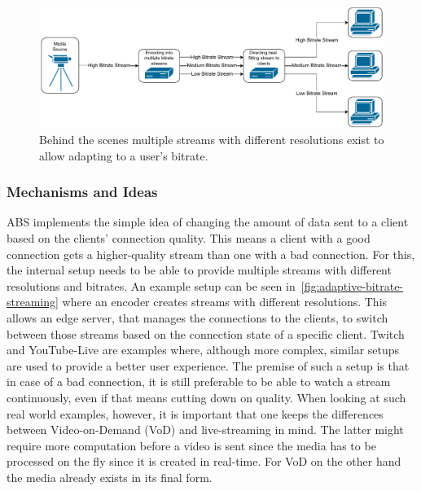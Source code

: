 \vspace{0.5cm}
\begin{figure}[H]
    \centering
    \includegraphics[width=\textwidth]{figures/02_background/adaptive-bitrate-streaming.drawio.pdf}
    \caption[Adaptive streaming schematic]{Behind the scenes multiple streams with different
    resolutions exist to allow adapting to a user's bitrate.}\label{fig:adaptive-bitrate-streaming}
\end{figure}
\vspace{1cm}

\subsubsection{Mechanisms and Ideas}
ABS implements the simple idea of changing the amount of data sent to a client 
based on the clients' connection quality.
This means a client with a good connection gets a higher-quality stream than 
one with a bad connection.
For this, the internal setup needs to be able to provide multiple streams with
different resolutions and bitrates.
An example setup can be seen in~\autoref{fig:adaptive-bitrate-streaming} where
an encoder creates streams with different resolutions.
This allows an edge server, that manages the connections to the clients, 
to switch between those streams based on the connection state of a specific client.
Twitch and YouTube-Live are examples where, although more complex, similar setups
are used to provide a better user experience.
The premise of such a setup is that in case of a bad connection, it is still 
preferable to be able to watch a stream continuously, even if that means
cutting down on quality.
When looking at such real world examples, however, it is important that one keeps 
the differences between Video-on-Demand (VoD) and live-streaming in mind.
The latter might require more computation before a video is sent since the media 
has to be processed on the fly since it is created in real-time.
For VoD on the other hand the media already exists in its final form. 

